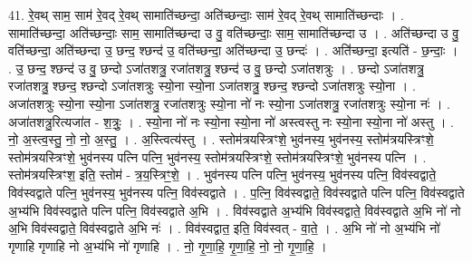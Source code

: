 \documentclass[17pt]{extarticle}
\begin{document}
41. रे॒वथ् साम॒ साम॑ रे॒वद् रे॒वथ् सामाति॑च्छन्दा॒ अति॑च्छन्दाः॒ साम॑ रे॒वद् रे॒वथ् सामाति॑च्छन्दाः । . सामाति॑च्छन्दा॒ अति॑च्छन्दाः॒ साम॒ सामाति॑च्छन्दा उ वु॒ वति॑च्छन्दाः॒ साम॒ सामाति॑च्छन्दा उ । . अति॑च्छन्दा उ वु॒ वति॑च्छन्दा॒ अति॑च्छन्दा उ॒ छन्द॒ श्छन्द॑ उ॒ वति॑च्छन्दा॒ अति॑च्छन्दा उ॒ छन्दः॑ । . अति॑॑च्छन्दा॒ इत्यति॑ - छ॒न्दाः॒ । . उ॒ छन्द॒ श्छन्द॑ उ वु॒ छन्दो ऽजा॑तशत्रु॒ रजा॑तशत्रु॒ श्छन्द॑ उ वु॒ छन्दो ऽजा॑तशत्रुः । . छन्दो ऽजा॑तशत्रु॒ रजा॑तशत्रु॒ श्छन्द॒ श्छन्दो ऽजा॑तशत्रुः स्यो॒ना स्यो॒ना ऽजा॑तशत्रु॒ श्छन्द॒ श्छन्दो ऽजा॑तशत्रुः स्यो॒ना । . अजा॑तशत्रुः स्यो॒ना स्यो॒ना ऽजा॑तशत्रु॒ रजा॑तशत्रुः स्यो॒ना नो॑ नः स्यो॒ना ऽजा॑तशत्रु॒ रजा॑तशत्रुः स्यो॒ना नः॑ । . अजा॑तशत्रु॒रित्यजा॑त - श॒त्रुः॒ । . स्यो॒ना नो॑ नः स्यो॒ना स्यो॒ना नो॑ अस्त्वस्तु नः स्यो॒ना स्यो॒ना नो॑ अस्तु । . नो॒ अ॒स्त्व॒स्तु॒ नो॒ नो॒ अ॒स्तु॒ । . अ॒स्त्वित्य॑स्तु । . स्तोम॑त्रयस्त्रिꣳशे॒ भुव॑नस्य॒ भुव॑नस्य॒ स्तोम॑त्रयस्त्रिꣳशे॒ स्तोम॑त्रयस्त्रिꣳशे॒ भुव॑नस्य पत्नि पत्नि॒ भुव॑नस्य॒ स्तोम॑त्रयस्त्रिꣳशे॒ स्तोम॑त्रयस्त्रिꣳशे॒ भुव॑नस्य पत्नि । . स्तोम॑त्रयस्त्रिꣳश॒ इति॒ स्तोम॑ - त्र॒य॒स्त्रिꣳ॒॒शे॒ । . भुव॑नस्य पत्नि पत्नि॒ भुव॑नस्य॒ भुव॑नस्य पत्नि॒ विव॑स्वद्वाते॒ विव॑स्वद्वाते पत्नि॒ भुव॑नस्य॒ भुव॑नस्य पत्नि॒ विव॑स्वद्वाते । . प॒त्नि॒ विव॑स्वद्वाते॒ विव॑स्वद्वाते पत्नि पत्नि॒ विव॑स्वद्वाते अ॒भ्य॑भि विव॑स्वद्वाते पत्नि पत्नि॒ विव॑स्वद्वाते अ॒भि । . विव॑स्वद्वाते अ॒भ्य॑भि विव॑स्वद्वाते॒ विव॑स्वद्वाते अ॒भि नो॑ नो अ॒भि विव॑स्वद्वाते॒ विव॑स्वद्वाते अ॒भि नः॑ । . विव॑स्वद्वात॒ इति॒ विव॑स्वत् - वा॒ते॒ । . अ॒भि नो॑ नो अ॒भ्य॑भि नो॑ गृणाहि गृणाहि नो अ॒भ्य॑भि नो॑ गृणाहि । . नो॒ गृ॒णा॒हि॒ गृ॒णा॒हि॒ नो॒ नो॒ गृ॒णा॒हि॒ । \newline
\pagebreak
{}
\end{document}
